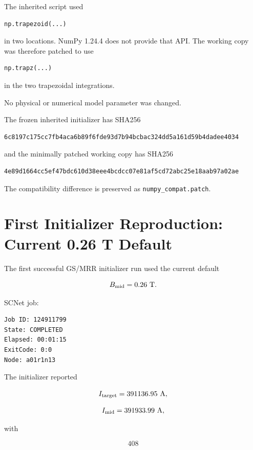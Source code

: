 \documentclass[11pt,a4paper]{article}
\begin{document}
The inherited script used

\begin{lstlisting}
np.trapezoid(...)
\end{lstlisting}

in two locations. NumPy 1.24.4 does not provide that API. The working copy was
therefore patched to use

\begin{lstlisting}
np.trapz(...)
\end{lstlisting}

in the two trapezoidal integrations.

No physical or numerical model parameter was changed.

The frozen inherited initializer has SHA256

\begin{lstlisting}
6c8197c175cc7fb4aca6b89f6fde93d7b94bcbac324dd5a161d59b4dadee4034
\end{lstlisting}

and the minimally patched working copy has SHA256

\begin{lstlisting}
4e89d1664cc5ef47bdc610d38eee4bcdcc07e81af5cd72abc25e18aab97a02ae
\end{lstlisting}

The compatibility difference is preserved as
\texttt{numpy\_compat.patch}.

\section{First Initializer Reproduction: Current 0.26 T Default}

The first successful GS/MRR initializer run used the current default

\[
B_{\rm mid}=0.26~\mathrm{T}.
\]

SCNet job:

\begin{lstlisting}
Job ID: 124911799
State: COMPLETED
Elapsed: 00:01:15
ExitCode: 0:0
Node: a01r1n13
\end{lstlisting}

The initializer reported

\[
I_{\rm target}=391136.95~\mathrm{A},
\]

\[
I_{\rm mid}=391933.99~\mathrm{A},
\]

with

\[
408
\]
\end{document}

